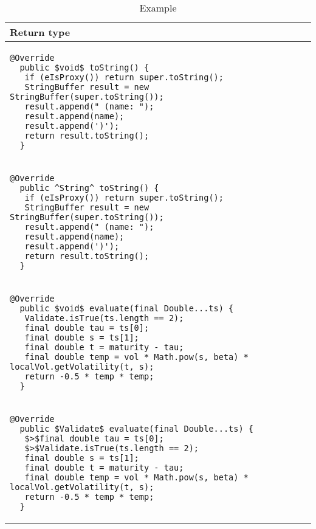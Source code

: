 \begin{table}[p]
\begin{tabular}{ | m{11cm} | }
  \hline
  Return type \\
  \hline
  {\begin{lstlisting}[style=table]
  @Override
  public $void$ toString() {
   if (eIsProxy()) return super.toString();
   StringBuffer result = new StringBuffer(super.toString());
   result.append(" (name: ");
   result.append(name);
   result.append(')');
   return result.toString();
  }
  \end{lstlisting}} \\
  {\begin{lstlisting}[style=table]
  @Override
  public ^String^ toString() {
   if (eIsProxy()) return super.toString();
   StringBuffer result = new StringBuffer(super.toString());
   result.append(" (name: ");
   result.append(name);
   result.append(')');
   return result.toString();
  }
  \end{lstlisting}} \\
  \hline
  \hline
  {\begin{lstlisting}[style=table]
  @Override
  public $void$ evaluate(final Double...ts) {
   Validate.isTrue(ts.length == 2);
   final double tau = ts[0];
   final double s = ts[1];
   final double t = maturity - tau;
   final double temp = vol * Math.pow(s, beta) * localVol.getVolatility(t, s);
   return -0.5 * temp * temp;
  }
  \end{lstlisting}} \\
  {\begin{lstlisting}[style=table]
  @Override
  public $Validate$ evaluate(final Double...ts) {
   $>$final double tau = ts[0];
   $>$Validate.isTrue(ts.length == 2);
   final double s = ts[1];
   final double t = maturity - tau;
   final double temp = vol * Math.pow(s, beta) * localVol.getVolatility(t, s);
   return -0.5 * temp * temp;
  }
  \end{lstlisting}} \\
  \hline
\end{tabular}
\caption{Example}
\label{return_type_showcase_table}
\end{table}

